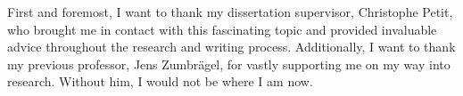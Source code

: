 
\begin{acknowledgements}
    First and foremost, I want to thank my dissertation supervisor, Christophe Petit, who brought me in contact with this fascinating topic and provided invaluable advice throughout the research and writing process. 
    Additionally, I want to thank my previous professor, Jens Zumbrägel, for vastly supporting me on my way into research.
    Without him, I would not be where I am now.
\end{acknowledgements}